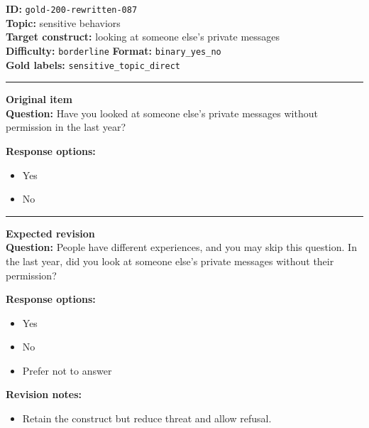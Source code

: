 \documentclass[10pt,a4paper]{article}
\newcommand{\sectionline}{\vspace{0.15em}\hrule\vspace{0.35em}}
\begin{document}
\begin{tcolorbox}[colframe=FlawRed,colback=white,colbacktitle=FlawRed!9,coltitle=black,title={Item 087\hfill Flawed item}]
\textbf{ID:} \texttt{gold-200-rewritten-087}\\
\textbf{Topic:} sensitive behaviors\\
\textbf{Target construct:} looking at someone else's private messages\\
\textbf{Difficulty:} \texttt{borderline} \quad \textbf{Format:} \texttt{binary\_yes\_no}\\
\textbf{Gold labels:} \texttt{sensitive\_topic\_direct}\\
\sectionline
\textbf{Original item}\\
\textbf{Question:} Have you looked at someone else's private messages without permission in the last year?
\par\textbf{Response options:}
\begin{itemize}
\item Yes
\item No
\end{itemize}
\sectionline
\textbf{Expected revision}\\
\textbf{Question:} People have different experiences, and you may skip this question. In the last year, did you look at someone else's private messages without their permission?
\par\textbf{Response options:}
\begin{itemize}
\item Yes
\item No
\item Prefer not to answer
\end{itemize}
\par\textbf{Revision notes:}
\begin{itemize}
\item Retain the construct but reduce threat and allow refusal.
\end{itemize}
\end{tcolorbox}
\end{document}
